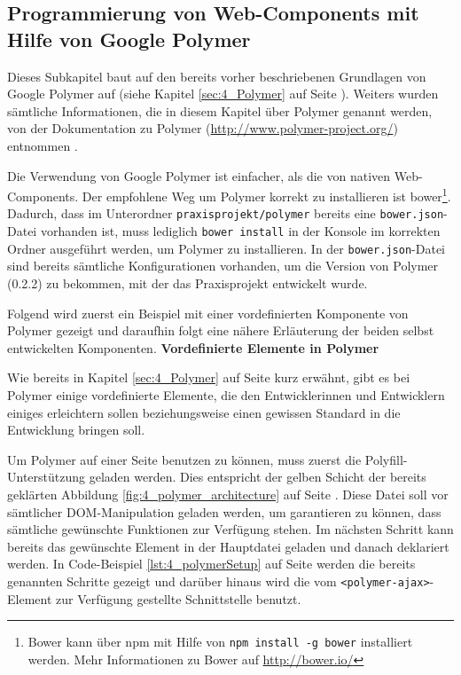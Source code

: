 \subsection{Programmierung von Web-Components mit Hilfe von Google Polymer}
\label{sec:6_WC_Polymer}

Dieses Subkapitel baut auf den bereits vorher beschriebenen Grundlagen von Google Polymer auf (siehe Kapitel \ref{sec:4_Polymer} auf Seite \pageref{sec:4_Polymer}). Weiters wurden sämtliche Informationen, die in diesem Kapitel über Polymer genannt werden, von der Dokumentation zu Polymer (\url{http://www.polymer-project.org/}) entnommen \citereset \autocite[siehe][]{Polymer}.

Die Verwendung von Google Polymer ist einfacher, als die von nativen Web-Components. Der empfohlene Weg um Polymer korrekt zu installieren ist \glqq bower\footnote{Bower kann über npm mit Hilfe von \lstinline|npm install -g bower| installiert werden. Mehr Informationen zu Bower auf \href{http://bower.io/}{http://bower.io/}}\grqq . Dadurch, dass im Unterordner \lstinline|praxisprojekt/polymer| bereits eine \lstinline|bower.json|-Datei vorhanden ist, muss lediglich \lstinline|bower install| in der Konsole im korrekten Ordner ausgeführt werden, um Polymer zu installieren. In der \lstinline|bower.json|-Datei sind bereits sämtliche Konfigurationen vorhanden, um die Version von Polymer (0.2.2) zu bekommen, mit der das Praxisprojekt entwickelt wurde.

Folgend wird zuerst ein Beispiel mit einer vordefinierten Komponente von Polymer gezeigt und daraufhin folgt eine nähere Erläuterung der beiden selbst entwickelten Komponenten.
\newpage
\textbf{Vordefinierte Elemente in Polymer}

Wie bereits in Kapitel \ref{sec:4_Polymer} auf Seite \pageref{sec:4_Polymer} kurz erwähnt, gibt es bei Polymer einige vordefinierte Elemente, die den Entwicklerinnen und Entwicklern einiges erleichtern sollen beziehungsweise einen gewissen Standard in die Entwicklung bringen soll.

Um Polymer auf einer Seite benutzen zu können, muss zuerst die Polyfill-Unterstützung geladen werden. Dies entspricht der gelben Schicht der bereits geklärten Abbildung \ref{fig:4_polymer_architecture} auf Seite \pageref{fig:4_polymer_architecture}.
Diese Datei soll vor sämtlicher DOM-Manipulation geladen werden, um garantieren zu können, dass sämtliche gewünschte Funktionen zur Verfügung stehen. Im nächsten Schritt kann bereits das gewünschte Element in der Hauptdatei geladen und danach deklariert werden. In Code-Beispiel \ref{lst:4_polymerSetup} auf Seite \pageref{lst:4_polymerSetup} werden die bereits genannten Schritte gezeigt und darüber hinaus wird die vom \lstinline|<polymer-ajax>|-Element zur Verfügung gestellte Schnittstelle benutzt.

